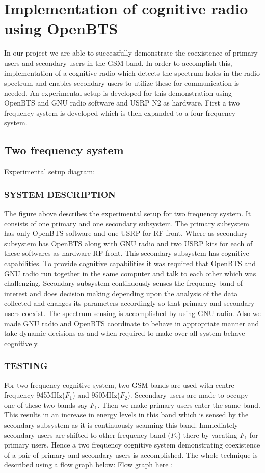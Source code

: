 \chapter{Implementation of cognitive radio using OpenBTS}

In our project we are able to successfully demonstrate the coexistence of 
primary users and secondary users in the GSM band. In order to accomplish this, 
implementation of a cognitive radio which detects the spectrum holes in the 
radio spectrum and enables secondary users to utilize these for communication 
is needed. An experimental setup is developed for this demonstration using 
OpenBTS and GNU radio software and USRP N2 as hardware. First a two frequency 
system is developed which is then expanded to a four frequency system.


\section{Two frequency system}

Experimental setup diagram:

\subsection{SYSTEM DESCRIPTION}
The figure above describes the experimental setup for two frequency system. It 
consists of one primary and one secondary subsystem. The primary subsystem has 
only OpenBTS software and one USRP for RF front. Where as secondary subsystem 
has OpenBTS along with GNU radio and two USRP kits for each of these softwares 
as hardware RF front. This secondary subsystem has cognitive capabilities. To 
provide cognitive capabilities it was required that OpenBTS and GNU radio run 
together in the same computer and talk to each other which was challenging. 
Secondary subsystem continuously senses the frequency band of interest and does 
decision making depending upon the analysis of the data collected and changes 
its parameters accordingly so that primary and secondary users coexist. The 
spectrum sensing is accomplished by using GNU radio. Also we made GNU radio and 
OpenBTS coordinate to behave in appropriate manner and take dynamic decisions 
as and when required to make over all system behave cognitively.

\subsection{TESTING}
For two frequency cognitive system, two GSM bands are used with centre 
frequency 945MHz($F_1$) and 950MHz($F_2$). Secondary users are made to occupy 
one of these two bands say $F_1$. Then we make primary users enter the same 
band. This results in an increase in energy levels in this band which is sensed 
by the secondary subsystem as it is continuously scanning this band. 
Immediately secondary users are shifted to other frequency band ($F_2$) there 
by vacating $F_1$ for primary users. Hence a two frequency cognitive system 
demonstrating coexistence of a pair of primary and secondary users is 
accomplished. 
The whole technique is described using a flow graph below:
Flow graph here :

